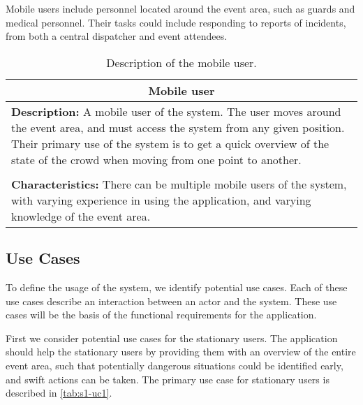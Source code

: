 Mobile users include personnel located around the event area, such as guards and medical personnel. Their tasks could include responding to reports of incidents, from both a central dispatcher and event attendees.

\begin{table}[h!]
    \centering
    \begin{tabularx}{/4}{X}
        \toprule
        \multicolumn{1}{c}{\textbf{Mobile user}} \\ 
        \midrule
        \textbf{Description:} A mobile user of the system. The user moves around the event area, and must access the system from any given position. Their primary use of the system is to get a quick overview of the state of the crowd when moving from one point to another. \\
        \\
        \textbf{Characteristics:} There can be multiple mobile users of the system, with varying experience in using the application, and varying knowledge of the event area. \\
        \bottomrule
    \end{tabularx}
    \caption{Description of the mobile user.}
    \label{tab:mob_user}
\end{table}

\subsection{Use Cases} \label{ss:s1_uc}
To define the usage of the system, we identify potential use cases. Each of these use cases describe an interaction between an actor and the system. These use cases will be the basis of the functional requirements for the application.

First we consider potential use cases for the stationary users. The application should help the stationary users by providing them with an overview of the entire event area, such that potentially dangerous situations could be identified early, and swift actions can be taken. The primary use case for stationary users is described in \cref{tab:s1-uc1}.


